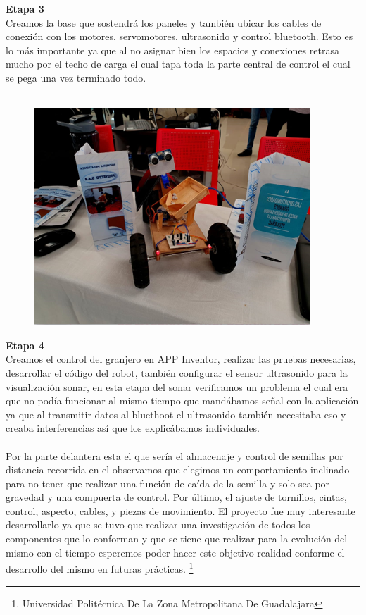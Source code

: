 \documentclass[11pt,a4paper]{article}
\begin{document}
\newpage
\textbf{Etapa 3}\\
Creamos la base que sostendrá los paneles y también ubicar los cables de conexión con los motores, servomotores, ultrasonido y control bluetooth. Esto es lo más importante ya que al no asignar bien los espacios y conexiones retrasa mucho por el techo de carga el cual tapa toda la parte central de control el cual se pega una vez terminado todo.\\\\
\begin{figure}[hbtp]
\centering
\includegraphics[scale=0.60]{Pictures/portada.png}
\end{figure} 

\textbf{Etapa 4}\\
Creamos el control del granjero en APP Inventor, realizar las pruebas necesarias, desarrollar el código del robot, también configurar el sensor ultrasonido para la visualización sonar, en esta etapa del sonar verificamos un problema el cual era que no podía funcionar al mismo tiempo que mandábamos señal con la aplicación ya que al transmitir datos al bluethoot el ultrasonido también necesitaba eso y creaba interferencias así que los explicábamos individuales.\\\\
Por la parte delantera esta el que sería el almacenaje y control de semillas por distancia recorrida en el observamos que elegimos un comportamiento inclinado para no tener que realizar una función de caída de la semilla y solo sea por gravedad y una compuerta de control.
Por último, el ajuste de tornillos, cintas, control, aspecto, cables, y piezas de movimiento. El proyecto fue muy interesante desarrollarlo ya que se tuvo que realizar una investigación de todos los componentes que lo conforman y que se tiene que realizar para la evolución del mismo con el tiempo esperemos poder hacer este objetivo realidad conforme el desarrollo del mismo en futuras prácticas.
 \footnote{Universidad Politécnica De La Zona Metropolitana De Guadalajara} 
\end{document}
